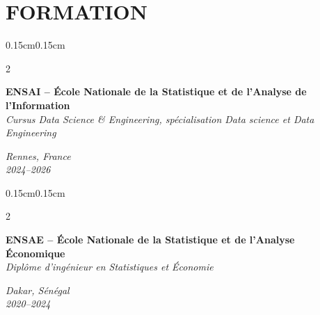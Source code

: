 \documentclass[9pt,letterpaper]{extarticle}
\newenvironment{onecolentry}{
  \begin{adjustwidth}{0.15cm}{0.15cm}
}{
  \end{adjustwidth}
}
\newenvironment{twocolentry}[2][]{
  \begin{onecolentry}
  \def\secondColumn{#2}
  \setcolumnwidth{\fill, 4.1cm}
  \begin{paracol}{2}
}{
  \switchcolumn \raggedleft \secondColumn
  \end{paracol}
  \end{onecolentry}
}
\begin{document}
\vspace{0.10cm}
\section{FORMATION}

\begin{twocolentry}{
\textit{Rennes, France} \\
\textit{2024–2026}}
  \textbf{ENSAI – École Nationale de la Statistique et de l’Analyse de l’Information} \\
  \textit{Cursus Data Science \& Engineering, spécialisation Data science et Data Engineering}
\end{twocolentry}

\vspace{0.10cm}

\begin{twocolentry}{
\textit{Dakar, Sénégal} \\
\textit{2020–2024}}
  \textbf{ENSAE – École Nationale de la Statistique et de l’Analyse Économique} \\
  \textit{Diplôme d’ingénieur en Statistiques et Économie}
\end{twocolentry}

\vspace{0.10cm}
\end{document}
